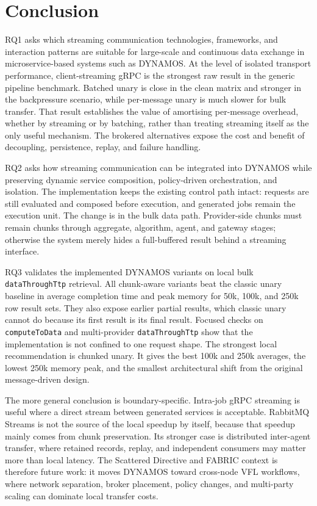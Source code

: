 \section{Conclusion}

RQ1 asks which streaming communication technologies, frameworks, and interaction patterns are suitable for large-scale and continuous data exchange in microservice-based systems such as DYNAMOS. At the level of isolated transport performance, client-streaming gRPC is the strongest raw result in the generic pipeline benchmark. Batched unary is close in the clean matrix and stronger in the backpressure scenario, while per-message unary is much slower for bulk transfer. That result establishes the value of amortising per-message overhead, whether by streaming or by batching, rather than treating streaming itself as the only useful mechanism. The brokered alternatives expose the cost and benefit of decoupling, persistence, replay, and failure handling.

RQ2 asks how streaming communication can be integrated into DYNAMOS while preserving dynamic service composition, policy-driven orchestration, and isolation. The implementation keeps the existing control path intact: requests are still evaluated and composed before execution, and generated jobs remain the execution unit. The change is in the bulk data path. Provider-side chunks must remain chunks through aggregate, algorithm, agent, and gateway stages; otherwise the system merely hides a full-buffered result behind a streaming interface.

RQ3 validates the implemented DYNAMOS variants on local bulk \texttt{dataThroughTtp} retrieval. All chunk-aware variants beat the classic unary baseline in average completion time and peak memory for 50k, 100k, and 250k row result sets. They also expose earlier partial results, which classic unary cannot do because its first result is its final result. Focused checks on \texttt{computeToData} and multi-provider \texttt{dataThroughTtp} show that the implementation is not confined to one request shape. The strongest local recommendation is chunked unary. It gives the best 100k and 250k averages, the lowest 250k memory peak, and the smallest architectural shift from the original message-driven design.

The more general conclusion is boundary-specific. Intra-job gRPC streaming is useful where a direct stream between generated services is acceptable. RabbitMQ Streams is not the source of the local speedup by itself, because that speedup mainly comes from chunk preservation. Its stronger case is distributed inter-agent transfer, where retained records, replay, and independent consumers may matter more than local latency. The Scattered Directive and FABRIC context is therefore future work: it moves DYNAMOS toward cross-node VFL workflows, where network separation, broker placement, policy changes, and multi-party scaling can dominate local transfer costs.


